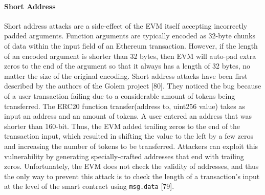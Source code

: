         \paragraph{Short Address}
            Short address attacks are a side-effect of the EVM itself accepting incorrectly padded arguments. 
            Function arguments are typically encoded as 32-byte chunks of data within the input field of an Ethereum transaction.
            However, if the length of an encoded argument is shorter than 32 bytes, then EVM will auto-pad extra zeros to the end of the argument so that it always has a length of 32 bytes, no matter the size of the original encoding.
            Short address attacks have been first described by the authors of the Golem project [80].
            They noticed the bug because of a user transaction failing due to a considerable amount of tokens being transferred.
            The ERC20 function transfer(address to, uint256 value) takes as input an address and an amount of tokens.
            A user entered an address that was shorter than 160-bit.
            Thus, the EVM added trailing zeros to the end of the transaction input, which resulted in shifting the value to the left by a few zeros and increasing the number of tokens to be transferred.
            Attackers can exploit this vulnerability by generating specially-crafted addresses that end with trailing zeros.
            Unfortunately, the EVM does not check the validity of addresses, and thus the only way to prevent this attack is to check the length of a transaction's input at the level of the smart contract using \texttt{msg.data} [79].